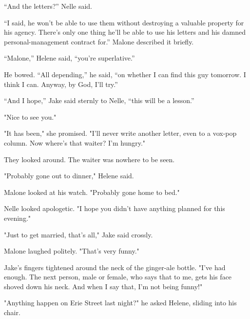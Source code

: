\documentclass{novel}
\begin{document}
“And the letters?” Nelle said.

“I said, he won’t be able to use them without destroying a valuable property for his agency. There’s only one thing he’ll be able to use his letters and his damned personal-management contract for.” Malone described it briefly.

“Malone,” Helene said, “you’re superlative.”

He bowed. “All depending,” he said, “on whether I can find this guy tomorrow. I think I can. Anyway, by God, I’ll try.”

“And I hope,” Jake said sternly to Nelle, “this will be a lesson.”

"Nice to see you."

"It has been," she promised. "I'll never write another letter, even to a vox-pop column. Now where's that waiter? I'm hungry."

They looked around. The waiter was nowhere to be seen.

"Probably gone out to dinner," Helene said.

Malone looked at his watch. "Probably gone home to bed."

Nelle looked apologetic. "I hope you didn't have anything planned for this evening."

"Just to get married, that's all," Jake said crossly.

Malone laughed politely. "That's very funny."

Jake's fingers tightened around the neck of the ginger-ale bottle. "I've had enough. The next person, male or female, who says that to me, gets his face shoved down his neck. And when I say that, I'm not being funny!"

\vspace{2\nbs}
\clearpage
\thispagestyle{empty}

\begin{ChapterStart}
\vspace{3\nbs}
\end{ChapterStart}

"Anything happen on Erie Street last night?" he asked Helene, sliding into his chair.
\end{document}
